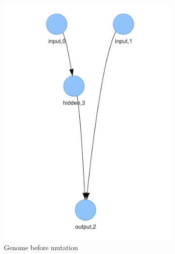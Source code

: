 \documentclass{article}
\begin{document}
\begin{figure}[h]
    \begin{subfigure}{.5\textwidth}
    \centering
      \includegraphics[width=1\linewidth]{second_genome.png}
      \caption{Genome before mutation}
    \end{subfigure}%
    \begin{subfigure}{.5\textwidth}
    \centering

\end{subfigure}
\end{figure}
\end{document}

